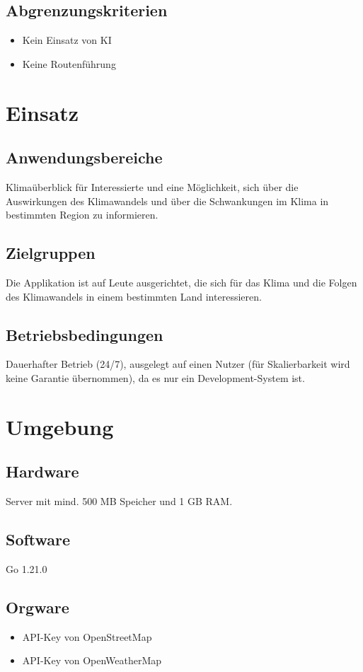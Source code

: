 \documentclass[a4paper]{scrreprt}
\begin{document}
\section{Abgrenzungskriterien}
\begin{itemize}
    \item Kein Einsatz von KI
    \item Keine Routenführung
\end{itemize}

\chapter{Einsatz}
\section{Anwendungsbereiche}
Klimaüberblick für Interessierte und eine Möglichkeit, sich über die Auswirkungen des Klimawandels und über die Schwankungen im Klima in bestimmten Region zu informieren.

\section{Zielgruppen}
Die Applikation ist auf Leute ausgerichtet, die sich für das Klima und die Folgen des Klimawandels in einem bestimmten Land interessieren.

\section{Betriebsbedingungen}
Dauerhafter Betrieb (24/7), ausgelegt auf einen Nutzer (für Skalierbarkeit wird keine Garantie übernommen), da es nur ein Development-System ist.

\chapter{Umgebung}
\section{Hardware}
Server mit mind. 500 MB Speicher und 1 GB RAM.

\section{Software}
Go 1.21.0

\section{Orgware}
\begin{itemize}
    \item API-Key von OpenStreetMap
    \item API-Key von OpenWeatherMap
\end{itemize}
\end{document}
